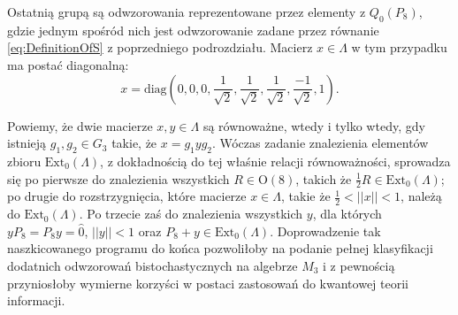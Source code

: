 Ostatnią grupą są odwzorowania reprezentowane przez elementy z $Q_{0}(P_{8})$,
gdzie jednym spośród nich jest odwzorowanie zadane przez równanie
\eqref{eq:DefinitionOfS} z poprzedniego podrozdziału.
Macierz
$x \in \Lambda$ w tym przypadku ma postać diagonalną:
\begin{equation}
  x =
 \text{diag}(0,0,0,
 \frac{1}{\sqrt{2}}, \frac{1}{\sqrt{2}}, \frac{1}{\sqrt{2}}, \frac{-1}{\sqrt{2}},
 1).
\end{equation}

Powiemy, że dwie macierze $x, y \in \Lambda$ są równoważne,
wtedy i tylko wtedy, gdy istnieją $g_{1}, g_{2} \in G_{3}$
takie, że $x = g_{1} y g_{2}$.
Wóczas zadanie znalezienia elementów zbioru $\text{Ext}_{0}(\Lambda)$,
z dokładnością do tej właśnie relacji równoważności,
sprowadza się po pierwsze do znalezienia wszystkich $R \in \mathrm{O}(8)$,
takich że
 $\frac{1}{2}R \in \text{Ext}_{0}(\Lambda)$;
po drugie do rozstrzygnięcia, które macierze  $x \in \Lambda$,
 takie że $\frac{1}{2} < ||x|| < 1$, należą do $\text{Ext}_{0}(\Lambda)$.
Po trzecie zaś do  znalezienia wszystkich $y$, dla których
 $y P_{8} = P_{8} y = \hat{0}$, $||y|| < 1$
 oraz $P_{8} + y \in \text{Ext}_0(\Lambda)$.
Doprowadzenie tak naszkicowanego programu do końca pozwoliłoby
na podanie pełnej klasyfikacji dodatnich odwzorowań bistochastycznych
na algebrze $M_3$ i z pewnością przyniosłoby wymierne korzyści w
postaci zastosowań do kwantowej teorii informacji.
